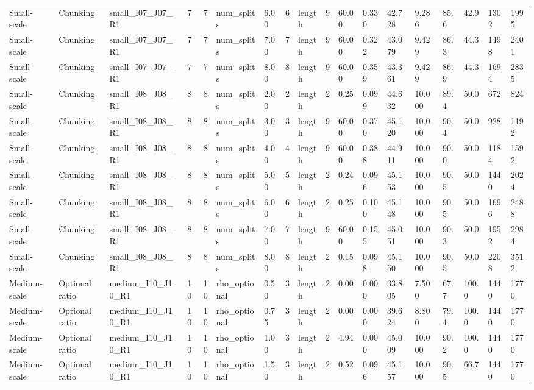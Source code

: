 \begin{longtable}{lllrrllllrllllllll}
Small-scale & Chunking & small\_I07\_J07\_R1 & 7 & 7 & num\_splits & 6.00 & 6 & length & 9 & 60.00 & 0.330 & 42.728 & 9.286 & 85.6 & 42.9 & 1302 & 1995 \\
Small-scale & Chunking & small\_I07\_J07\_R1 & 7 & 7 & num\_splits & 7.00 & 7 & length & 9 & 60.00 & 0.322 & 43.079 & 9.429 & 86.3 & 44.3 & 1498 & 2401 \\
Small-scale & Chunking & small\_I07\_J07\_R1 & 7 & 7 & num\_splits & 8.00 & 8 & length & 9 & 60.00 & 0.359 & 43.361 & 9.429 & 86.9 & 44.3 & 1694 & 2835 \\
Small-scale & Chunking & small\_I08\_J08\_R1 & 8 & 8 & num\_splits & 2.00 & 2 & length & 2 & 0.25 & 0.099 & 44.632 & 10.000 & 89.4 & 50.0 & 672 & 824 \\
Small-scale & Chunking & small\_I08\_J08\_R1 & 8 & 8 & num\_splits & 3.00 & 3 & length & 9 & 60.00 & 0.370 & 45.120 & 10.000 & 90.4 & 50.0 & 928 & 1192 \\
Small-scale & Chunking & small\_I08\_J08\_R1 & 8 & 8 & num\_splits & 4.00 & 4 & length & 9 & 60.00 & 0.388 & 44.911 & 10.000 & 90.0 & 50.0 & 1184 & 1592 \\
Small-scale & Chunking & small\_I08\_J08\_R1 & 8 & 8 & num\_splits & 5.00 & 5 & length & 2 & 0.24 & 0.096 & 45.153 & 10.000 & 90.5 & 50.0 & 1440 & 2024 \\
Small-scale & Chunking & small\_I08\_J08\_R1 & 8 & 8 & num\_splits & 6.00 & 6 & length & 2 & 0.25 & 0.100 & 45.148 & 10.000 & 90.5 & 50.0 & 1696 & 2488 \\
Small-scale & Chunking & small\_I08\_J08\_R1 & 8 & 8 & num\_splits & 7.00 & 7 & length & 9 & 60.00 & 0.155 & 45.051 & 10.000 & 90.3 & 50.0 & 1952 & 2984 \\
Small-scale & Chunking & small\_I08\_J08\_R1 & 8 & 8 & num\_splits & 8.00 & 8 & length & 2 & 0.15 & 0.098 & 45.150 & 10.000 & 90.5 & 50.0 & 2208 & 3512 \\
Medium-scale & Optional ratio & medium\_I10\_J10\_R1 & 10 & 10 & rho\_optional & 0.50 & 3 & length & 2 & 0.00 & 0.000 & 33.805 & 7.500 & 67.7 & 100.0 & 1440 & 1770 \\
Medium-scale & Optional ratio & medium\_I10\_J10\_R1 & 10 & 10 & rho\_optional & 0.75 & 3 & length & 2 & 0.00 & 0.000 & 39.624 & 8.800 & 79.4 & 100.0 & 1440 & 1770 \\
Medium-scale & Optional ratio & medium\_I10\_J10\_R1 & 10 & 10 & rho\_optional & 1.00 & 3 & length & 2 & 4.94 & 0.000 & 45.009 & 10.000 & 90.2 & 100.0 & 1440 & 1770 \\
Medium-scale & Optional ratio & medium\_I10\_J10\_R1 & 10 & 10 & rho\_optional & 1.50 & 3 & length & 2 & 0.52 & 0.096 & 45.157 & 10.000 & 90.5 & 66.7 & 1440 & 1770 \\

\end{longtable}
